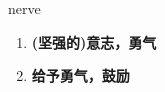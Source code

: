 
\begin{frame}
{\huge nerve}
\begin{center}
\begin{enumerate}\Large
  \item \textbf{(坚强的)意志，勇气}
  \item \textbf{给予勇气，鼓励}
\end{enumerate}
\end{center}
\end{frame}
